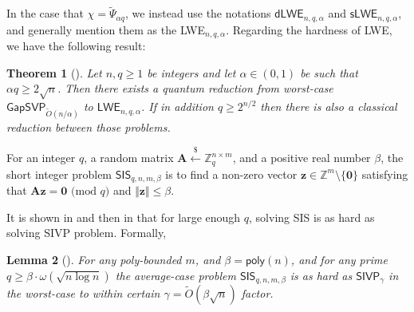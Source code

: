 \documentclass[a4paper,11pt,onecolumn]{elsarticle}
\newtheorem{theorem}{Theorem}
\newtheorem{lemma}[theorem]{Lemma}
\begin{document}
	\fi
	In the case that $\chi=\widetilde{\Psi}_{\alpha q}$, we instead use the notations $ \textsf{dLWE}_{n,q,\alpha}$ and $ \textsf{sLWE}_{n,q,\alpha}$, 
	 and generally mention them as the \textsf{LWE}$_{n,q,\alpha}$.  
	Regarding the hardness of \textsf{LWE}, we have the following result: %
	\begin{theorem}[{\cite[Theorem 2.16]{BLP+13}}] \label{theo1}
		 Let $n, q\geq 1$ be integers and let $\alpha \in (0,1)$ be such that $\alpha q \geq 2\sqrt{n}$. Then there exists a quantum reduction from worst-case $\mathsf{GapSVP}_{\widetilde{O}(n/\alpha)}$ to $\mathsf{LWE}_{n,q,\alpha}$. If in addition $q\geq 2^{n/2}$ then there is also a classical reduction between those problems.
		
	\end{theorem}
	
	
	\begin{definition}[SIS] \label{def2}
		For an integer $q$, a random matrix $\mathbf{A} \xleftarrow{\$} \mathbb{Z}_q^{n \times m}$, and a positive real number $\beta$, the short integer problem $\mathsf{SIS}_{q,n,m, \beta}$ is to find a non-zero vector $\mathbf{z}\in \mathbb{Z}^{m} \setminus \{\mathbf{0}\}$ satisfying that $\mathbf{A}\mathbf{z} =\mathbf{0} \text{ (mod } q)$ and $\Vert \mathbf{z}\Vert \leq \beta.$
	\end{definition}
	
	
	It is shown in \cite{MR07} and then in \cite{GPV08} that for large enough $q$, solving SIS is as hard as solving SIVP problem.  Formally, 
	
	\begin{lemma}[{\cite[Proposition 5.7]{GPV08}}] For any poly-bounded $m$, and $\beta=\textsf{poly}(n)$, and for any prime $q \geq \beta\cdot \omega(\sqrt{n\log n})$ the average-case problem $\mathsf{SIS}_{q,n,m,\beta}$ is as hard as $\mathsf{SIVP}_\gamma$ in the worst-case to within certain $\gamma=\widetilde{O}(\beta\sqrt{n})$ factor.
		
		\end{lemma}
	
\end{document}
